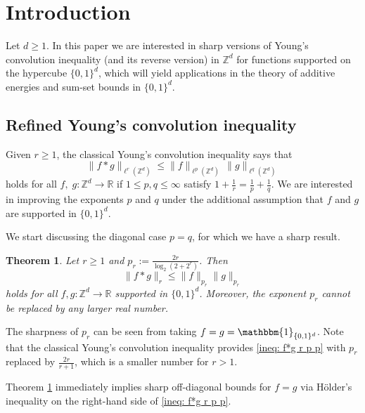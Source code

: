 \documentclass[reqno, 10pt]{amsart}
\theoremstyle{plain}
\numberwithin{equation}{section}
\newtheorem{theorem}{Theorem}[section]
\theoremstyle{definition}
\newtheorem*{induction hypothesis}{Induction hypothesis}
\theoremstyle{remark}
\newcommand{\R}{\mathbb{R}}
\newcommand{\Z}{\mathbb{Z}}
\begin{document}
\maketitle

\section{Introduction}

Let $d \geq 1$. In this paper we are interested in sharp versions of Young's convolution inequality (and its reverse version) in $\Z^d$ for functions supported on the hypercube $\{0,1\}^d$, which will yield applications in the theory of additive energies and sum-set bounds in $\{0,1\}^d$.

\subsection{Refined Young's convolution inequality}
Given $r \geq 1$, the classical Young's convolution inequality says that 
\begin{equation}\label{goal-inequality}
    \lVert f * g \rVert_{\ell^r(\Z^d)} \leq \lVert f \rVert_{\ell^p(\Z^d)} \, \lVert g \rVert_{\ell^q(\Z^d)}
\end{equation}
holds for all $f, \; g: \Z^d \to \R$ if $1 \leq p,q \leq \infty$ satisfy $1+\frac{1}{r}=\frac{1}{p}+\frac{1}{q}$. We are interested in improving the exponents $p$ and $q$ under the additional assumption that $f$ and $g$ are supported in $\{0,1\}^d$.

We start discussing the diagonal case $p=q$, for which we have a sharp result. 
\begin{theorem}\label{thm: f g r p p}
    Let $r\geq 1$ and $p_r:=\frac{2r}{\log_2(2+2^r)}$. Then
\begin{equation}\label{ineq: f*g r p p}
\|f*g\|_r\leq \|f\|_{p_r} \|g\|_{p_r}
\end{equation}
holds for all $f,g:\Z^d\to \R$ supported in $\{0,1\}^d$. Moreover, the exponent $p_r$ cannot be replaced by any larger real number.
\end{theorem}
The sharpness of $p_r$ can be seen from taking $f=g=\mathbbm{1}_{\{0,1\}^d}$. Note that the classical Young's convolution inequality provides \eqref{ineq: f*g r p p} with $p_r$ replaced by $\frac{2r}{r+1}$, which is a smaller number for $r>1$.

Theorem \ref{thm: f g r p p} immediately implies sharp off-diagonal bounds for $f=g$ via Hölder's inequality on the right-hand side of \eqref{ineq: f*g r p p}.
\end{document}
